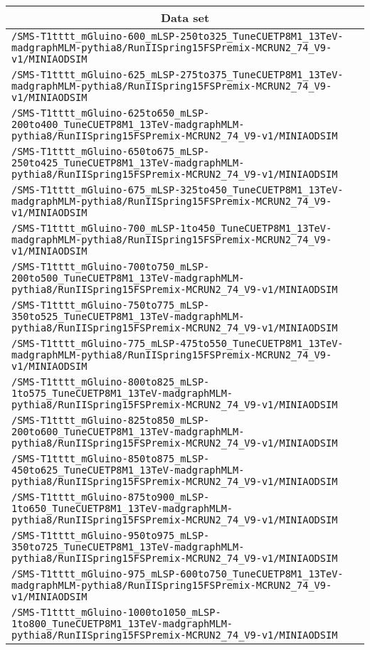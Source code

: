 \begin{center}
\begin{tabular}{l}
\hline\hline
\multicolumn{1}{c}{Data set}\tabularnewline
\hline
\verb!/SMS-T1tttt_mGluino-600_mLSP-250to325_TuneCUETP8M1_13TeV-madgraphMLM-pythia8/RunIISpring15FSPremix-MCRUN2_74_V9-v1/MINIAODSIM! \tabularnewline
\verb!/SMS-T1tttt_mGluino-625_mLSP-275to375_TuneCUETP8M1_13TeV-madgraphMLM-pythia8/RunIISpring15FSPremix-MCRUN2_74_V9-v1/MINIAODSIM! \tabularnewline
\verb!/SMS-T1tttt_mGluino-625to650_mLSP-200to400_TuneCUETP8M1_13TeV-madgraphMLM-pythia8/RunIISpring15FSPremix-MCRUN2_74_V9-v1/MINIAODSIM! \tabularnewline
\verb!/SMS-T1tttt_mGluino-650to675_mLSP-250to425_TuneCUETP8M1_13TeV-madgraphMLM-pythia8/RunIISpring15FSPremix-MCRUN2_74_V9-v1/MINIAODSIM! \tabularnewline
\verb!/SMS-T1tttt_mGluino-675_mLSP-325to450_TuneCUETP8M1_13TeV-madgraphMLM-pythia8/RunIISpring15FSPremix-MCRUN2_74_V9-v1/MINIAODSIM! \tabularnewline
\verb!/SMS-T1tttt_mGluino-700_mLSP-1to450_TuneCUETP8M1_13TeV-madgraphMLM-pythia8/RunIISpring15FSPremix-MCRUN2_74_V9-v1/MINIAODSIM! \tabularnewline
\verb!/SMS-T1tttt_mGluino-700to750_mLSP-200to500_TuneCUETP8M1_13TeV-madgraphMLM-pythia8/RunIISpring15FSPremix-MCRUN2_74_V9-v1/MINIAODSIM! \tabularnewline
\verb!/SMS-T1tttt_mGluino-750to775_mLSP-350to525_TuneCUETP8M1_13TeV-madgraphMLM-pythia8/RunIISpring15FSPremix-MCRUN2_74_V9-v1/MINIAODSIM! \tabularnewline
\verb!/SMS-T1tttt_mGluino-775_mLSP-475to550_TuneCUETP8M1_13TeV-madgraphMLM-pythia8/RunIISpring15FSPremix-MCRUN2_74_V9-v1/MINIAODSIM! \tabularnewline
\verb!/SMS-T1tttt_mGluino-800to825_mLSP-1to575_TuneCUETP8M1_13TeV-madgraphMLM-pythia8/RunIISpring15FSPremix-MCRUN2_74_V9-v1/MINIAODSIM! \tabularnewline
\verb!/SMS-T1tttt_mGluino-825to850_mLSP-200to600_TuneCUETP8M1_13TeV-madgraphMLM-pythia8/RunIISpring15FSPremix-MCRUN2_74_V9-v1/MINIAODSIM! \tabularnewline
\verb!/SMS-T1tttt_mGluino-850to875_mLSP-450to625_TuneCUETP8M1_13TeV-madgraphMLM-pythia8/RunIISpring15FSPremix-MCRUN2_74_V9-v1/MINIAODSIM! \tabularnewline
\verb!/SMS-T1tttt_mGluino-875to900_mLSP-1to650_TuneCUETP8M1_13TeV-madgraphMLM-pythia8/RunIISpring15FSPremix-MCRUN2_74_V9-v1/MINIAODSIM! \tabularnewline
\verb!/SMS-T1tttt_mGluino-950to975_mLSP-350to725_TuneCUETP8M1_13TeV-madgraphMLM-pythia8/RunIISpring15FSPremix-MCRUN2_74_V9-v1/MINIAODSIM! \tabularnewline
\verb!/SMS-T1tttt_mGluino-975_mLSP-600to750_TuneCUETP8M1_13TeV-madgraphMLM-pythia8/RunIISpring15FSPremix-MCRUN2_74_V9-v1/MINIAODSIM! \tabularnewline
\verb!/SMS-T1tttt_mGluino-1000to1050_mLSP-1to800_TuneCUETP8M1_13TeV-madgraphMLM-pythia8/RunIISpring15FSPremix-MCRUN2_74_V9-v1/MINIAODSIM! \tabularnewline

\end{tabular}
\end{center}
